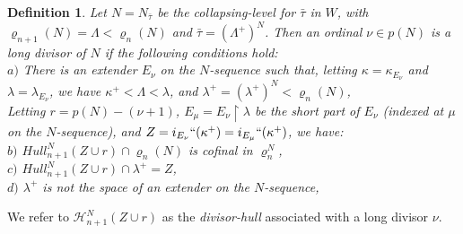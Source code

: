 \documentclass[12pt]{article}
\newtheorem{defn}[thm]{Definition}
\begin{document}
\begin{defn} \label{long divisor}
Let $N = N_{\bar{\tau}}$ be the collapsing-level for $\bar{\tau}$ in $W$, with $\varrho_{n+1}(N) = \Lambda < \varrho_n (N)$ and $\bar{\tau} = (\Lambda^+ )^N$.  Then an ordinal $\nu \in p(N)$ is a \textit{long divisor} of $N$ if the following conditions hold:\\

\indent \indent $a)$ There is an extender $E_\nu$ on the $N$-sequence such that, letting $\kappa = \kappa_{E_\nu}$ and $\lambda = \lambda_{E_\nu}$, we have $\kappa^+ < \Lambda < \lambda$, and $\lambda^+ = (\lambda^+)^N < \varrho_n (N)$,\\

Letting $r = p (N) - (\nu + 1)$, $E_\mu = E_\nu \restriction \lambda$ be the short part of $E_\nu$ (indexed at $\mu$ on the $N$-sequence), and $Z = i_{E_\nu}``(\kappa^+) =  i_{E_\mu}``(\kappa^+)$, we have:\\



\indent \indent $b)$ $Hull_{n+1}^N ( Z \cup r ) \cap \varrho_n (N)$ is cofinal in $\varrho_n^N$,\\

\indent \indent $c)$ $Hull_{n+1}^N ( Z \cup r ) \cap \lambda^+ = Z$,\\

\indent \indent $d)$ $\lambda^+$ is not the space of an extender on the $N$-sequence,\\


\end{defn}


We refer to $\mathcal{H}_{n+1}^N ( Z \cup r )$ as the \textit{divisor-hull} associated with a long divisor $\nu$.\\
\end{document}
